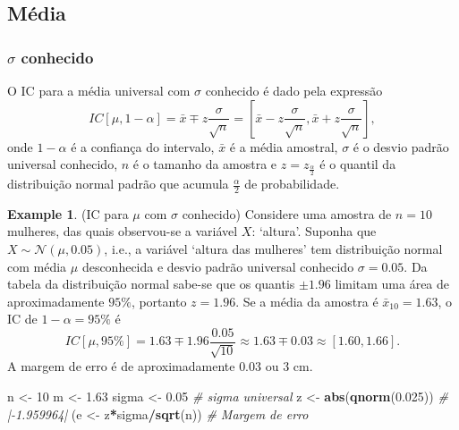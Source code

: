 \documentclass[
]{book}
\newenvironment{Shaded}{\begin{snugshade}}{\end{snugshade}}
\newcommand{\CommentTok}[1]{\textcolor[rgb]{0.56,0.35,0.01}{\textit{#1}}}
\newcommand{\DecValTok}[1]{\textcolor[rgb]{0.00,0.00,0.81}{#1}}
\newcommand{\FloatTok}[1]{\textcolor[rgb]{0.00,0.00,0.81}{#1}}
\newcommand{\KeywordTok}[1]{\textcolor[rgb]{0.13,0.29,0.53}{\textbf{#1}}}
\newcommand{\NormalTok}[1]{#1}
\newcommand{\OperatorTok}[1]{\textcolor[rgb]{0.81,0.36,0.00}{\textbf{#1}}}
\newcommand{\StringTok}[1]{\textcolor[rgb]{0.31,0.60,0.02}{#1}}
\theoremstyle{definition}
\theoremstyle{definition}
\newtheorem{example}{Example}[chapter]
\theoremstyle{definition}
\theoremstyle{remark}
\begin{document}
\hypertarget{muxe9dia-1}{%
\subsection{Média}\label{muxe9dia-1}}

\hypertarget{sigma-conhecido}{%
\subsubsection*{\texorpdfstring{\(\sigma\) conhecido}{\textbackslash sigma conhecido}}\label{sigma-conhecido}}

O IC para a média universal com \(\sigma\) conhecido é dado pela expressão
\begin{equation}
IC \left[ \mu, 1-\alpha \right] = \bar{x} \mp z \dfrac{\sigma}{\sqrt{n}} = \left[ \bar{x} - z \dfrac{\sigma}{\sqrt{n}}, \bar{x} + z \dfrac{\sigma}{\sqrt{n}} \right],
\label{eq:ic-media-sigma}
\end{equation}
onde \(1-\alpha\) é a confiança do intervalo, \(\bar{x}\) é a média amostral, \(\sigma\) é o desvio padrão universal conhecido, \(n\) é o tamanho da amostra e \(z=z_{\frac{\alpha}{2}}\) é o quantil da distribuição normal padrão que acumula \(\frac{\alpha}{2}\) de probabilidade.

\begin{example}
\protect\hypertarget{exm:ic-media-sigma}{}{\label{exm:ic-media-sigma} }(IC para \(\mu\) com \(\sigma\) conhecido) Considere uma amostra de \(n=10\) mulheres, das quais observou-se a variável \(X\): `altura'. Suponha que \(X \sim \mathcal{N}(\mu,0.05)\), i.e., a variável `altura das mulheres' tem distribuição normal com média \(\mu\) desconhecida e desvio padrão universal conhecido \(\sigma = 0.05\). Da tabela da distribuição normal sabe-se que os quantis \(\pm 1.96\) limitam uma área de aproximadamente \(95\%\), portanto \(z=1.96\). Se a média da amostra é \(\bar{x}_{10} = 1.63\), o IC de \(1-\alpha=95\%\) é \[ IC \left[ \mu, 95\% \right] = 1.63 \mp 1.96 \dfrac{0.05}{\sqrt{10}} \approx 1.63 \mp 0.03 \approx \left[ 1.60, 1.66 \right]. \] A margem de erro é de aproximadamente \(0.03\) ou 3 cm.
\end{example}

\begin{Shaded}
\begin{Highlighting}[]
\NormalTok{n \textless{}{-}}\StringTok{ }\DecValTok{10}
\NormalTok{m \textless{}{-}}\StringTok{ }\FloatTok{1.63}
\NormalTok{sigma \textless{}{-}}\StringTok{ }\FloatTok{0.05}                   \CommentTok{\# \textquotesingle{}sigma\textquotesingle{} universal}
\NormalTok{z \textless{}{-}}\StringTok{ }\KeywordTok{abs}\NormalTok{(}\KeywordTok{qnorm}\NormalTok{(}\FloatTok{0.025}\NormalTok{))          }\CommentTok{\# |{-}1.959964|}
\NormalTok{(e \textless{}{-}}\StringTok{ }\NormalTok{z}\OperatorTok{*}\NormalTok{sigma}\OperatorTok{/}\KeywordTok{sqrt}\NormalTok{(n))          }\CommentTok{\# Margem de erro}
\end{Highlighting}
\end{Shaded}
\end{document}
